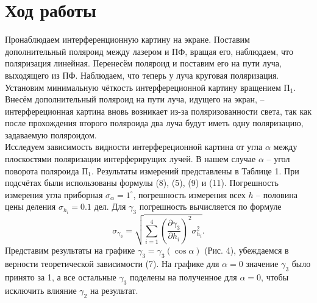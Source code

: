 \documentclass[a4paper,12pt]{article}
\begin{document}
\section*{Ход работы}
Пронаблюдаем интерференционную картину на экране. Поставим дополнительный поляроид между лазером и ПФ, вращая его, наблюдаем, что поляризация линейная. Перенесём поляроид и поставим его на пути луча, выходящего из ПФ. Наблюдаем, что теперь у луча круговая поляризация. Установим минимальную чёткость интерфереционной картину вращением $\text{П}_1$. Внесём дополнительный поляроид на пути луча, идущего на экран, -- интерфереционная картина вновь возникает из-за поляризованности света, так как после прохождения второго поляроида два луча будут иметь одну поляризацию, задаваемую поляроидом.\\
Исследуем зависимость видности интерфереционной картина от угла $\alpha$ между плоскостями поляризации интерферирущих лучей. В нашем случае $\alpha$ -- угол поворота поляроида $\text{П}_1$. Результаты измерений представлены в Таблице 1. При подсчётах были использованы формулы (8), (5), (9) и (11). Погрешность измерения угла приборная $\sigma_\alpha = 1^\circ$, погрешность измерения всех $h$ -- половина цены деления $\sigma_{h_i} = 0.1 \text{ дел}$. Для $\gamma_3$ погрешность вычисляется по формуле 
$$
\sigma_{\gamma_3} = \sqrt{\sum\limits_{i=1}^4\left(\dfrac{\partial \gamma_3}{\partial h_i}\right)^2 \sigma^2_{h_i}}.
$$
Представим результаты на графике $\gamma_3 = \gamma_3(\cos \alpha)$ (Рис. 4), убеждаемся в верности теоретической зависимости (7). На графике для $\alpha = 0$ значение $\gamma_3$ было принято за 1, а все остальные $\gamma_3$ поделены на полученное для $\alpha = 0$, чтобы исключить влияние $\gamma_2$ на результат.
\newpage
\end{document}
